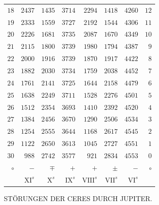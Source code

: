 \begin{center}
\begin{tabular}{r|r|r|r|r|r|r|r}
$18$ & $2437$ & $1435$ & $3714$ & $2294$ & $1418$ & $4260$ & $12$ \\
$19$ & $2333$ & $1559$ & $3727$ & $2192$ & $1544$ & $4306$ & $11$ \\
$20$ & $2226$ & $1681$ & $3735$ & $2087$ & $1670$ & $4349$ & $10$ \\[3pt]
$21$ & $2115$ & $1800$ & $3739$ & $1980$ & $1794$ & $4387$ & $9$ \\
$22$ & $2000$ & $1916$ & $3739$ & $1870$ & $1917$ & $4422$ & $8$ \\
$23$ & $1882$ & $2030$ & $3734$ & $1759$ & $2038$ & $4452$ & $7$ \\
$24$ & $1761$ & $2141$ & $3725$ & $1644$ & $2158$ & $4479$ & $6$ \\
$25$ & $1638$ & $2249$ & $3711$ & $1528$ & $2276$ & $4501$ & $5$ \\[3pt]
$26$ & $1512$ & $2354$ & $3693$ & $1410$ & $2392$ & $4520$ & $4$ \\
$27$ & $1384$ & $2456$ & $3670$ & $1290$ & $2506$ & $4534$ & $3$ \\
$28$ & $1254$ & $2555$ & $3644$ & $1168$ & $2617$ & $4545$ & $2$ \\
$29$ & $1122$ & $2650$ & $3613$ & $1045$ & $2727$ & $4551$ & $1$ \\
$30$ & $988$ & $2742$ & $3577$ & $921$ & $2834$ & $4553$ & $0$ \\
\hline $\circ$ & $-$ & $\mp$ & $+$ & $+$ & $\pm$ & $-$ & $\circ$ \\
 & $\mathrm{XI}^s$ & $\mathrm{X}^s$ & $\mathrm{IX}^s$ & $\mathrm{VIII}^s$ & $\mathrm{VII}^s$ & $\mathrm{VI}^s$ & \\
\end{tabular}\endgroup
\end{center}

\clearpage

%

\begin{center}STÖRUNGEN DER CERES DURCH JUPITER.\end{center}

